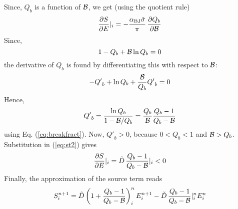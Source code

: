 \documentclass[12pt]{book}
\begin{document}
Since, $Q_b$ is a function of ${\cal B}$, we get (using the quotient rule)
\begin{equation}
  \frac{\partial S}{\partial E} |_i = -\frac{\alpha_{\rm BJ} \tilde{\sigma}}{\pi}\, \frac{\partial Q_b}{\partial {\cal B}}
  \label{eq:st2}
\end{equation}
Since,
\begin{equation}
  1- Q_b + {\cal B} \ln Q_b = 0
  \label{eq:breakfract}
\end{equation}
the derivative of $Q_b$ is found by differentiating this with respect to ${\cal B}$:
\begin{equation}
  -{Q'}_{b} + \ln Q_b + \frac{\cal B}{Q_b} {Q'}_{b} = 0
\end{equation}
Hence,
\begin{equation}
  {Q'}_{b} = \frac{\ln Q_b}{1 - {\cal B}/Q_b} = \frac{Q_b}{\cal B} \frac{Q_b - 1}{Q_b - {\cal B}}
\end{equation}
using Eq. (\ref{eq:breakfract}). Now, ${Q'}_{b} > 0$, because $0 < Q_b < 1$ and ${\cal B} > Q_b$.
Substitution in (\ref{eq:st2}) gives
\begin{equation}
  \frac{\partial S}{\partial E} |_i = {\tilde D} \, \frac{Q_b - 1}{Q_b - {\cal B}} |_i < 0
\end{equation}
Finally, the approximation of the source term reads
\begin{equation}
  S^{n+1}_{i} = {\tilde D} \left( 1 + \frac{Q_b - 1}{Q_b - {\cal B}} \right)_i^n E_i^{n+1} - {\tilde D} \, \frac{Q_b - 1}{Q_b - {\cal B}} |^n_i E_i^n
\end{equation}
\end{document}
